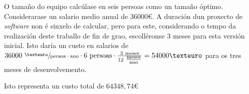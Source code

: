 O tamaño do equipo calcúlase en seis persoas como un tamaño óptimo\cite{chaosmanifesto}. Considerarase un salario medio anual de $ 36 000€ $\cite{ccii}\cite{confidencial}\cite{ine}. A duración dun proxecto de \textit{software} non é sinxelo de calcular, pero para este, considerando o tempo da realización deste traballo de fin de grao, escolléronse 3 meses para esta versión inicial. Isto daría un custo en salarios de $ 36000 ~ \sfrac{\text{€}}{\text{persoa} \cdot \text{ano}} \cdot 6 ~ \text{persoas} \cdot \frac{3 ~ \text{meses}}{12 ~ \tfrac{\text{meses}}{\text{ano}}} = 54000 € $ para os tres meses de desenvolvemento.

Isto representa un custo total de $ 64 348,74€ $